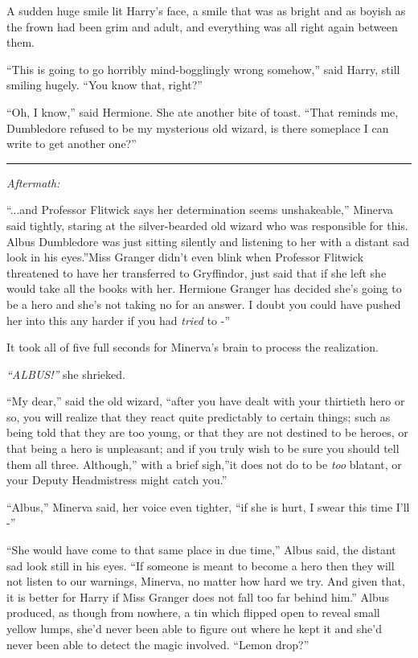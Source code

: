 A sudden huge smile lit Harry's face, a smile that was as bright and as
boyish as the frown had been grim and adult, and everything was all
right again between them.

``This is going to go horribly mind-bogglingly wrong somehow,'' said
Harry, still smiling hugely. ``You know that, right?''

``Oh, I know,'' said Hermione. She ate another bite of toast. ``That
reminds me, Dumbledore refused to be my mysterious old wizard, is there
someplace I can write to get another one?''

\begin{center}\rule{3in}{0.4pt}\end{center}

\emph{Aftermath:}

``...and Professor Flitwick says her determination seems
unshakeable,'' Minerva said tightly, staring at the silver-bearded old
wizard who was responsible for this. Albus Dumbledore was just sitting
silently and listening to her with a distant sad look in his eyes.''Miss
Granger didn't even blink when Professor Flitwick threatened to have her
transferred to Gryffindor, just said that if she left she would take all
the books with her. Hermione Granger has decided she's going to be a
hero and she's not taking no for an answer. I doubt you could have
pushed her into this any harder if you had \emph{tried} to -''

It took all of five full seconds for Minerva's brain to process the
realization.

\emph{``ALBUS!''} she shrieked.

``My dear,'' said the old wizard, ``after you have dealt with your
thirtieth hero or so, you will realize that they react quite predictably
to certain things; such as being told that they are too young, or that
they are not destined to be heroes, or that being a hero is unpleasant;
and if you truly wish to be sure you should tell them all three.
Although,'' with a brief sigh,''it does not do to be \emph{too} blatant,
or your Deputy Headmistress might catch you.''

``Albus,'' Minerva said, her voice even tighter, ``if she is hurt, I
swear this time I'll -''

``She would have come to that same place in due time,'' Albus said, the
distant sad look still in his eyes. ``If someone is meant to become a
hero then they will not listen to our warnings, Minerva, no matter how
hard we try. And given that, it is better for Harry if Miss Granger does
not fall too far behind him.'' Albus produced, as though from nowhere, a
tin which flipped open to reveal small yellow lumps, she'd never been
able to figure out where he kept it and she'd never been able to detect
the magic involved. ``Lemon drop?''

